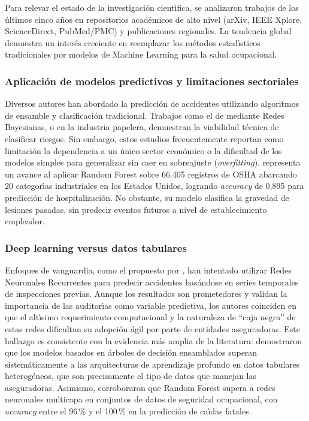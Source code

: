 Para relevar el estado de la investigaci\'on cient\'{\i}fica, se analizaron trabajos de los \'ultimos cinco a\~nos en repositorios acad\'emicos de alto nivel (arXiv, IEEE Xplore, ScienceDirect, PubMed/PMC) y publicaciones regionales. La tendencia global demuestra un inter\'es creciente en reemplazar los m\'etodos estad\'{\i}sticos tradicionales por modelos de Machine Learning para la salud ocupacional.

\subsubsection{Aplicaci\'on de modelos predictivos y limitaciones sectoriales}

Diversos autores han abordado la predicci\'on de accidentes utilizando algoritmos de ensamble y clasificaci\'on tradicional. Trabajos como el de \textcite{subauste2023} mediante Redes Bayesianas, o \textcite{mosquera2021} en la industria papelera, demuestran la viabilidad t\'ecnica de clasificar riesgos. Sin embargo, estos estudios frecuentemente reportan como limitaci\'on la dependencia a un \'unico sector econ\'omico o la dificultad de los modelos simples para generalizar sin caer en sobreajuste (\emph{overfitting}). \textcite{sarkar2022} representa un avance al aplicar Random Forest sobre 66.405 registros de OSHA abarcando 20 categor\'{\i}as industriales en los Estados Unidos, logrando \emph{accuracy} de 0,895 para predicci\'on de hospitalizaci\'on. No obstante, su modelo clasifica la gravedad de lesiones pasadas, sin predecir eventos futuros a nivel de establecimiento empleador.

\subsubsection{Deep learning versus datos tabulares}

Enfoques de vanguardia, como el propuesto por \textcite{yapi2025}, han intentado utilizar Redes Neuronales Recurrentes para predecir accidentes bas\'andose en series temporales de inspecciones previas. Aunque los resultados son prometedores y validan la importancia de las auditor\'{\i}as como variable predictiva, los autores coinciden en que el alt\'{\i}simo requerimiento computacional y la naturaleza de ``caja negra'' de estas redes dificultan su adopci\'on \'agil por parte de entidades aseguradoras. Este hallazgo es consistente con la evidencia m\'as amplia de la literatura: \textcite{grinsztajn2022} demostraron que los modelos basados en \'arboles de decisi\'on ensamblados superan sistem\'aticamente a las arquitecturas de aprendizaje profundo en datos tabulares heterog\'eneos, que son precisamente el tipo de datos que manejan las aseguradoras. Asimismo, \textcite{zermane2022} corroboraron que Random Forest supera a redes neuronales multicapa en conjuntos de datos de seguridad ocupacional, con \emph{accuracy} entre el 96\,\% y el 100\,\% en la predicci\'on de ca\'{\i}das fatales.

